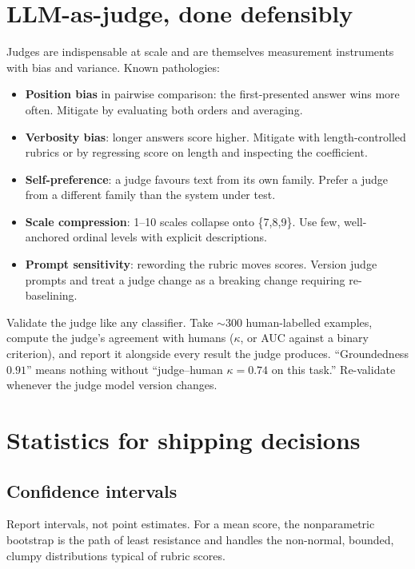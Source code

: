 \documentclass[11pt,twoside,openright]{book}
\theoremstyle{definition}
\theoremstyle{plain}
\theoremstyle{remark}
\newcommand{\term}[1]{\textbf{#1}}
\begin{document}
\section{LLM-as-judge, done defensibly}

Judges are indispensable at scale and are themselves measurement instruments
with bias and variance. Known pathologies:

\begin{itemize}[leftmargin=1.4em]
  \item \term{Position bias} in pairwise comparison: the first-presented answer
        wins more often. Mitigate by evaluating both orders and averaging.
  \item \term{Verbosity bias}: longer answers score higher. Mitigate with
        length-controlled rubrics or by regressing score on length and
        inspecting the coefficient.
  \item \term{Self-preference}: a judge favours text from its own family. Prefer
        a judge from a different family than the system under test.
  \item \term{Scale compression}: 1--10 scales collapse onto \{7,8,9\}. Use
        few, well-anchored ordinal levels with explicit descriptions.
  \item \term{Prompt sensitivity}: rewording the rubric moves scores. Version
        judge prompts and treat a judge change as a breaking change requiring
        re-baselining.
\end{itemize}

\begin{practice}
Validate the judge like any classifier. Take $\sim\!300$ human-labelled
examples, compute the judge's agreement with humans ($\kappa$, or AUC against
a binary criterion), and report it alongside every result the judge produces.
``Groundedness $0.91$'' means nothing without ``judge--human $\kappa = 0.74$ on
this task.'' Re-validate whenever the judge model version changes.
\end{practice}

\section{Statistics for shipping decisions}

\subsection{Confidence intervals}

Report intervals, not point estimates. For a mean score, the nonparametric
bootstrap is the path of least resistance and handles the non-normal, bounded,
clumpy distributions typical of rubric scores.
\end{document}
